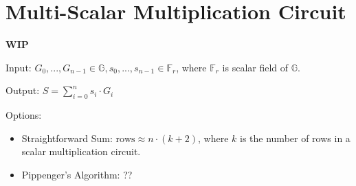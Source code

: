 \section{Multi-Scalar Multiplication Circuit}
\label{section:msm}
\textbf{WIP}


Input: $G_0, ..., G_{n - 1} \in \mathbb{G}, s_0, ..., s_{n - 1} \in \mathbb{F}_r$, where $\mathbb{F}_r$ is scalar field of $\mathbb{G}$.


Output: $S = \sum\limits_{i = 0}^{n}s_i \cdot G_i$


Options:
\begin{itemize}
	\item Straightforward Sum: $\text{rows} \approx n \cdot (k + 2)$, where $k$ is the number of rows in a scalar multiplication circuit. 
	\item Pippenger's Algorithm: ??
\end{itemize}



